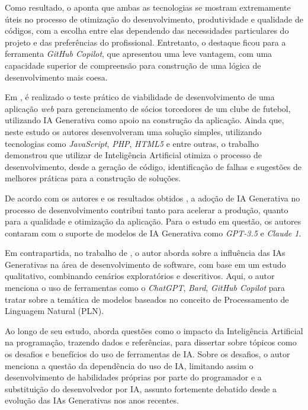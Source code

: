 \documentclass[english,brazilian]{UNISINOSartigo} %
\begin{document}
Como resultado, o  aponta que ambas as tecnologias se mostram extremamente úteis no processo de otimização do desenvolvimento, produtividade e qualidade de códigos, com a escolha entre elas dependendo das necessidades particulares do projeto e das preferências do profissional. Entretanto, o destaque ficou para a ferramenta \textit{GitHub Copilot}, que apresentou uma leve vantagem, com uma capacidade superior de compreensão para construção de uma lógica de desenvolvimento mais coesa.

Em , é realizado o teste prático de viabilidade de desenvolvimento de uma aplicação \textit{web} para gerenciamento de sócios torcedores de um clube de futebol, utilizando IA Generativa como apoio na construção da aplicação. Ainda que, neste estudo os autores desenvolveram uma solução simples, utilizando tecnologias como \textit{JavaScript}, \textit{PHP}, \textit{HTML5} e entre outras, o trabalho demonstrou que utilizar de Inteligência Artificial otimiza o processo de desenvolvimento, desde a geração de código, identificação de falhas e sugestões de melhores práticas para a construção de soluções.

De acordo com os autores e os resultados obtidos \cite{daSilva2025}, a adoção de IA Generativa no processo de desenvolvimento contribui tanto para acelerar a produção, quanto para a qualidade e otimização da aplicação. Para o estudo em questão, os autores contaram com o suporte de modelos de IA Generativa como \textit{GPT-3.5} e \textit{Claude 1}.

Em contrapartida, no trabalho de , o autor aborda sobre a influência das IAs Generativas na área de desenvolvimento de software, com base em um estudo qualitativo, combinando cenários exploratórios e descritivos. Aqui, o autor menciona o uso de ferramentas como o \textit{ChatGPT}, \textit{Bard}, \textit{GitHub Copilot} para tratar sobre a temática de modelos baseados no conceito de Processamento de Linguagem Natural (PLN).

Ao longo de seu estudo,  aborda questões como o impacto da Inteligência Artificial na programação, trazendo dados e referências, para dissertar sobre tópicos como os desafios e benefícios do uso de ferramentas de IA. Sobre os desafios, o autor menciona a questão da dependência do uso de IA, limitando assim o desenvolvimento de habilidades próprias por parte do programador e a substituição do desenvolvedor por IA, assunto fortemente debatido desde a evolução das IAs Generativas nos anos recentes. 
\end{document}
